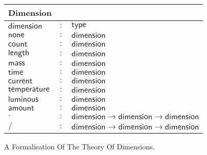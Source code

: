 \begin{figure}[h]
  \begin{center}
    \begin{tabular}{|l c l|}
      \hline
      \textsf{Dimension} & &\\\hline
      $\mathsf{dimension}$ & $:$ & $ \mathsf{type}$\\

      $\mathsf{none}$ & $:$ & $ \mathsf{dimension}$\\
      $\mathsf{count}$ & $:$ & $ \mathsf{dimension}$\\
      $\mathsf{length}$ & $:$ & $ \mathsf{dimension}$\\
      $\mathsf{mass}$ & $:$ & $ \mathsf{dimension}$\\
      $\mathsf{time}$ & $:$ & $ \mathsf{dimension}$\\
      $\mathsf{current}$ & $:$ & $ \mathsf{dimension}$\\
      $\mathsf{temperature}$ & $:$ & $ \mathsf{dimension}$\\
      $\mathsf{luminous}$ & $:$ & $ \mathsf{dimension}$\\
      $\mathsf{amount}$ & $:$ & $ \mathsf{dimension}$\\

      $\cdot{}$ & $:$ & $ \mathsf{dimension} \rightarrow \mathsf{dimension} \rightarrow \mathsf{dimension}$\\
      $/$ & $:$ & $ \mathsf{dimension} \rightarrow \mathsf{dimension} \rightarrow \mathsf{dimension}$\\\hline
    \end{tabular}
  \end{center}
  \caption{A Formalisation Of The Theory Of Dimensions. }
  \label{fig:dimensions}
\end{figure}
